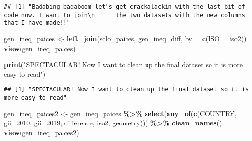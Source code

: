 \documentclass[
]{article}
\newenvironment{Shaded}{\begin{snugshade}}{\end{snugshade}}
\newcommand{\AttributeTok}[1]{\textcolor[rgb]{0.13,0.29,0.53}{#1}}
\newcommand{\FunctionTok}[1]{\textcolor[rgb]{0.13,0.29,0.53}{\textbf{#1}}}
\newcommand{\NormalTok}[1]{#1}
\newcommand{\OtherTok}[1]{\textcolor[rgb]{0.56,0.35,0.01}{#1}}
\newcommand{\SpecialCharTok}[1]{\textcolor[rgb]{0.81,0.36,0.00}{\textbf{#1}}}
\newcommand{\StringTok}[1]{\textcolor[rgb]{0.31,0.60,0.02}{#1}}
\begin{document}
\begin{verbatim}
## [1] "Badabing badaboom let's get crackalackin with the last bit of code now. I want to join\n      the two datasets with the new columns that I have made!!"
\end{verbatim}

\begin{Shaded}
\begin{Highlighting}[]
\NormalTok{gen\_ineq\_paices }\OtherTok{\textless{}{-}} \FunctionTok{left\_join}\NormalTok{(solo\_paices, gen\_ineq\_diff, }\AttributeTok{by =} \FunctionTok{c}\NormalTok{(}\StringTok{\textquotesingle{}ISO\textquotesingle{}} \OtherTok{=} \StringTok{\textquotesingle{}iso2\textquotesingle{}}\NormalTok{))}
\FunctionTok{view}\NormalTok{(gen\_ineq\_paices)}
\end{Highlighting}
\end{Shaded}

\begin{Shaded}
\begin{Highlighting}[]
\FunctionTok{print}\NormalTok{(}\StringTok{"SPECTACULAR! Now I want to clean up the final dataset so it is more easy to read"}\NormalTok{)}
\end{Highlighting}
\end{Shaded}

\begin{verbatim}
## [1] "SPECTACULAR! Now I want to clean up the final dataset so it is more easy to read"
\end{verbatim}

\begin{Shaded}
\begin{Highlighting}[]
\NormalTok{gen\_ineq\_paices2 }\OtherTok{\textless{}{-}}\NormalTok{ gen\_ineq\_paices }\SpecialCharTok{\%\textgreater{}\%}
  \FunctionTok{select}\NormalTok{(}\FunctionTok{any\_of}\NormalTok{(}\FunctionTok{c}\NormalTok{(}\StringTok{\textquotesingle{}COUNTRY\textquotesingle{}}\NormalTok{, }\StringTok{\textquotesingle{}gii\_2010\textquotesingle{}}\NormalTok{, }\StringTok{\textquotesingle{}gii\_2019\textquotesingle{}}\NormalTok{, }\StringTok{\textquotesingle{}difference\textquotesingle{}}\NormalTok{, }\StringTok{\textquotesingle{}iso2\textquotesingle{}}\NormalTok{, }
                  \StringTok{\textquotesingle{}geometry\textquotesingle{}}\NormalTok{))) }\SpecialCharTok{\%\textgreater{}\%}
  \FunctionTok{clean\_names}\NormalTok{()}
\FunctionTok{view}\NormalTok{(gen\_ineq\_paices2)}
\end{Highlighting}
\end{Shaded}
\end{document}

